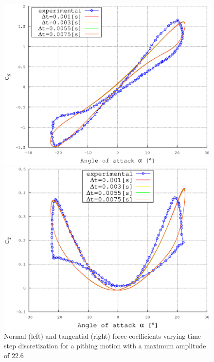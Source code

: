 \documentclass[a4paper]{jpconf}
\begin{document}
\begin{figure}[h]
\begin{minipage}{18pc}
\includegraphics[width=\columnwidth]{CN226dtLEScoarse.eps}
\end{minipage}\hspace{2pc}%
\begin{minipage}{18pc}
\includegraphics[width=\columnwidth]{CT226dtLEScoarse.eps}
\end{minipage} 
\caption{\label{figdtcoarse}Normal (left) and tangential (right) force coefficients varying time-step discretization for a pithing motion with a maximum amplitude of 22.6\degree\ }
\end{figure}
\end{document}
